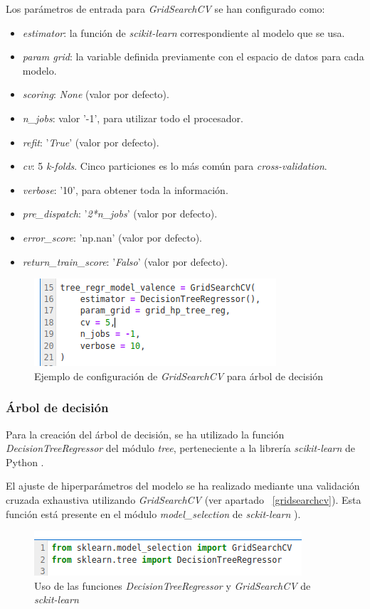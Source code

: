 \documentclass[12pt,a4paper]{article}
\begin{document}
Los parámetros de entrada para \textit{GridSearchCV} se han configurado como:
\begin{itemize}
	\item \textit{estimator}: la función de \textit{scikit-learn} correspondiente al modelo que se usa.
	\item \textit{param grid}: la variable definida previamente con el espacio de datos para cada modelo.
	\item \textit{scoring}: \textit{None} (valor por defecto).
	\item \textit{n\_jobs}: valor '-1', para utilizar todo el procesador.
	\item \textit{refit}: '\textit{True}' (valor por defecto).
	\item \textit{cv}: 5 \textit{k-folds}. Cinco particiones es lo más común para \textit{cross-validation}.
	\item \textit{verbose}: '10', para obtener toda la información.
	\item \textit{pre\_dispatch}: '\textit{2*n\_jobs}' (valor por defecto).
	\item \textit{error\_score}: 'np.nan' (valor por defecto).
	\item \textit{return\_train\_score}: '\textit{Falso}' (valor por defecto).
\end{itemize}
\begin{figure}[H]
	\centering
	\includegraphics[width=0.7\linewidth]{figs/cv_tree}
	\caption{Ejemplo de configuración de \textit{GridSearchCV} para árbol de decisión}
	\label{fig:cvtree}
\end{figure}



\subsubsection{Árbol de decisión}
Para la creación del árbol de decisión, se ha utilizado la función \textit{DecisionTreeRegressor} del módulo \textit{tree}, perteneciente a la librería \textit{scikit-learn} de Python \cite{scikit-learn}.


El ajuste de hiperparámetros del modelo se ha realizado mediante una validación cruzada exhaustiva utilizando \textit{GridSearchCV} (ver apartado ~\ref{gridsearchcv}). Esta función está presente en el módulo \textit{model\_selection} de \textit{sckit-learn} \cite{scikit-learn}).
\begin{figure}[H]
	\centering
	\includegraphics[width=0.7\linewidth]{figs/import_tree}
	\caption{Uso de las funciones \textit{DecisionTreeRegressor} y \textit{GridSearchCV} de \textit{sckit-learn}}
	\label{fig:importtree}
\end{figure}
\end{document}

